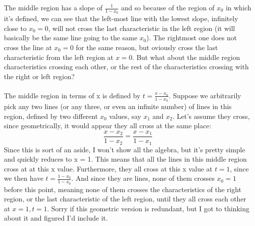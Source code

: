 \documentclass{article}
\begin{document}
The middle region has a slope of $\frac{1}{1-x_0}$ and so because of the region of $x_0$ in which it's defined, we can see that the left-most line with the lowest slope, infinitely close to $x_0 = 0$, will not cross the last characteristic in the left region (it will basically be the same line going to the same $x_0$). The rightmost one does not cross the line at $x_0=0$ for the same reason, but oviously cross the last characteristic from the left region at $x=0$. But what about the middle region characteristics crossing each other, or the rest of the characteristics crossing with the right or left region?\\
\\
The middle region in terms of x is defined by $t = \frac{x - x_0}{1-x_0}$. Suppose we arbitrarily pick any two lines (or any three, or even an infinite number) of lines in this region, defined by two different $x_0$ values, say $x_1$ and $x_2$. Let's assume they cross, since geometrically, it would appear they all cross at the same place:
\begin{equation}
\frac{x-x_2}{1-x_2} = \frac{x-x_1}{1-x_1}
\end{equation}
Since this is sort of an aside, I won't show all the algebra, but it's pretty simple and quickly reduces to x = 1. This means that all the lines in this middle region cross at at this x value. Furthermore, they all cross at this x value at $t=1$, since we then have $t = \frac{1 - x_0}{1 - x_0}$. And since they are lines, none of them crosses $x_0 = 1$ before this point, meaning none of them crosses the characteristics of the right region, or the last characteristic of the left region, until they all cross each other at $x = 1, t = 1$. Sorry if this geometric version is redundant, but I got to thinking about it and figured I'd include it.
\end{document}
